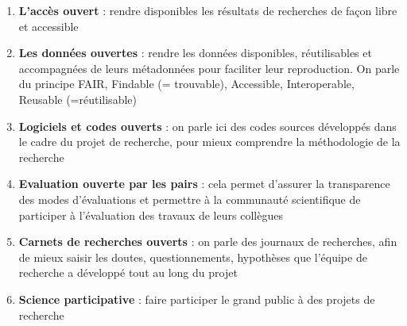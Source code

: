 \begin{enumerate}
    \item \textbf{L’accès ouvert} : rendre disponibles les résultats de recherches de façon libre et accessible
    \item \textbf{Les données ouvertes} : rendre les données disponibles, réutilisables et accompagnées de leurs métadonnées pour faciliter leur reproduction. On parle du principe FAIR, Findable (= trouvable), Accessible, Interoperable, Reusable (=réutilisable)
    \item \textbf{Logiciels et codes ouverts} :  on parle ici des codes sources développés dans le cadre du projet de recherche, pour mieux comprendre la méthodologie de la recherche
    \item \textbf{Evaluation ouverte par les pairs} : cela permet d’assurer la transparence des modes d’évaluations et permettre à la communauté scientifique de participer à l’évaluation des travaux de leurs collègues
    \item \textbf{Carnets de recherches ouverts} : on parle des journaux de recherches, afin de mieux saisir les doutes, questionnements, hypothèses que l’équipe de recherche a développé tout au long du projet 
    \item \textbf{Science participative} : faire participer le grand public à des projets de recherche
\end{enumerate}

